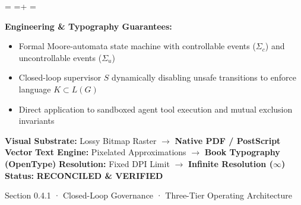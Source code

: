 \documentclass[10pt,a4paper,landscape]{article}
\newcommand{\pdautoscale}[2]{%
  \pdmaxh=#1\relax
  \pdmaxw=#2\relax
  \sbox{\pdscaledbox}{\usebox{\pdfigbox}}%
  \pdcurh=\dimexpr\ht\pdscaledbox+\dp\pdscaledbox\relax
  \pdcurw=\wd\pdscaledbox
  \ifdim\dimexpr\pdcurw * 100 / \pdmaxw\relax > \dimexpr\pdcurh * 100 / \pdmaxh\relax
    \resizebox{\pdmaxw}{!}{\usebox{\pdscaledbox}}%
  \else
    \resizebox{!}{\pdmaxh}{\usebox{\pdscaledbox}}%
  \fi
}
\begin{document}
\begin{minipage}[t]{0.492\linewidth}
  \begin{tcolorbox}[
    colback=pdcobalt!3,colframe=pdcobalt!85!black,arc=1.5pt,
    boxrule=0.7pt,top=1.5pt,bottom=1.5pt,left=4pt,right=4pt,
    title={\pdgrotesk\footnotesize\bfseries \color{white} B. Authoritative Native Vector Replacement \hfill \texttt{.tex / TikZ / PGF}}
  ]
    \begin{minipage}[c][8.3cm][c]{\linewidth}
      \centering
      \sbox{\pdfigbox}{}
      \pdautoscale{8.0cm}{\linewidth}
    \end{minipage}
    \tcblower
    \begin{minipage}[t][2.0cm][t]{\linewidth}
      \pdgrotesk\scriptsize
      \textbf{{\color{pdcobalt} Engineering \& Typography Guarantees:}}\\
      \begin{itemize}[leftmargin=9pt,itemsep=0pt,topsep=0.5pt,parsep=0pt]
        \item Formal Moore-automata state machine with controllable events ($\Sigma_c$) and uncontrollable events ($\Sigma_u$)
        \item Closed-loop supervisor $S$ dynamically disabling unsafe transitions to enforce language $K \subset L(G)$
        \item Direct application to sandboxed agent tool execution and mutual exclusion invariants
      \end{itemize}
    \end{minipage}
  \end{tcolorbox}
\end{minipage}

\vspace*{0.05cm}
\noindent
\begin{tcolorbox}[
  colback=hhpaper,colframe=hhgray!35,arc=1.5pt,boxrule=0.4pt,
  top=1.5pt,bottom=1.5pt,left=6pt,right=6pt
]
  \pdgrotesk\scriptsize
  \noindent
  \textbf{Visual Substrate:} Lossy Bitmap Raster $\rightarrow$ \textbf{\color{pdcobalt}Native PDF / PostScript Vector}\hfill
  \textbf{Text Engine:} Pixelated Approximations $\rightarrow$ \textbf{\color{pdcobalt}Book Typography (OpenType)}\hfill
  \textbf{Resolution:} Fixed DPI Limit $\rightarrow$ \textbf{\color{pdcobalt}Infinite Resolution ($\infty$)}\hfill
  \textbf{Status:} \textbf{\color{pdteal}RECONCILED \& VERIFIED}
\end{tcolorbox}
\clearpage

\noindent
\begin{minipage}[t]{\linewidth}
  \hfill
  {\pdgrotesk\footnotesize\color{hhgray} Section 0.4.1 · Closed-Loop Governance · Three-Tier Operating Architecture}\\
  \vspace*{0.03cm}
  \noindent{\color{hhgray!40}\rule{\linewidth}{0.5pt}}
\end{minipage}
\end{document}
